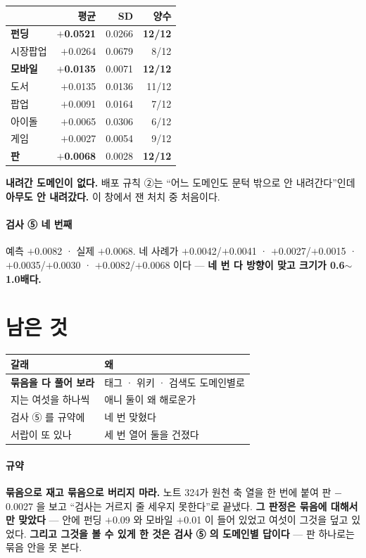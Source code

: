\documentclass[10pt]{article}
\begin{document}
\begin{center}\footnotesize
\begin{tabular}{lrrr}
\hline
 & 평균 & SD & 양수 \\
\hline
\textbf{펀딩} & \textbf{$+$0.0521} & 0.0266 & \textbf{12/12} \\
시장팝업 & $+$0.0264 & 0.0679 & 8/12 \\
\textbf{모바일} & \textbf{$+$0.0135} & 0.0071 & \textbf{12/12} \\
도서 & $+$0.0135 & 0.0136 & 11/12 \\
팝업 & $+$0.0091 & 0.0164 & 7/12 \\
아이돌 & $+$0.0065 & 0.0306 & 6/12 \\
게임 & $+$0.0027 & 0.0054 & 9/12 \\
\hline
\textbf{판} & \textbf{$+$0.0068} & 0.0028 & \textbf{12/12} \\
\hline
\end{tabular}
\end{center}

\textbf{내려간 도메인이 없다.} 배포 규칙 ②는 ``어느 도메인도 문턱 밖으로
안 내려간다''인데 \textbf{아무도 안 내려갔다.} 이 창에서 잰 처치 중
처음이다.

\paragraph{검사 ⑤ 네 번째} 예측 $+$0.0082 · 실제 $+$0.0068. 네 사례가
$+$0.0042/$+$0.0041 · $+$0.0027/$+$0.0015 · $+$0.0035/$+$0.0030 ·
$+$0.0082/$+$0.0068 이다 --- \textbf{네 번 다 방향이 맞고 크기가
0.6$\sim$1.0배다.}

\section{남은 것}
\begin{center}\footnotesize
\begin{tabular}{ll}
\hline
갈래 & 왜 \\
\hline
\textbf{묶음을 다 풀어 보라} & 태그 · 위키 · 검색도 도메인별로 \\
지는 여섯을 하나씩 & 애니 둘이 왜 해로운가 \\
검사 ⑤ 를 규약에 & 네 번 맞혔다 \\
서랍이 또 있나 & 세 번 열어 둘을 건졌다 \\
\hline
\end{tabular}
\end{center}

\paragraph{규약} \textbf{묶음으로 재고 묶음으로 버리지 마라.} 노트 324가
원천 축 열을 한 번에 붙여 판 $-$0.0027 을 보고 ``검사는 거르지 줄 세우지
못한다''로 끝냈다. \textbf{그 판정은 묶음에 대해서만 맞았다} --- 안에
펀딩 $+$0.09 와 모바일 $+$0.01 이 들어 있었고 여섯이 그것을 덮고 있었다.
\textbf{그리고 그것을 볼 수 있게 한 것은 검사 ⑤ 의 도메인별 답이다} ---
판 하나로는 묶음 안을 못 본다.
\end{document}
